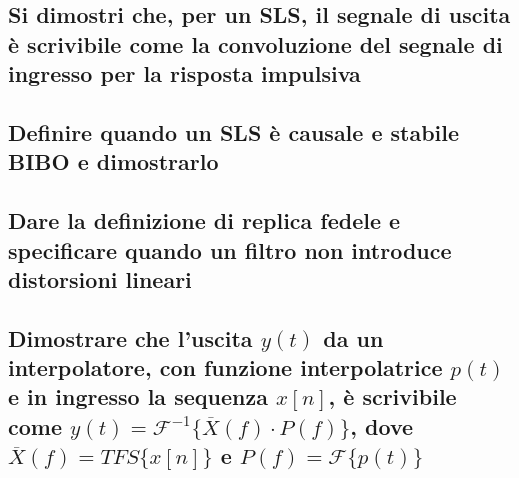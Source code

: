 \documentclass[12pt,oneside,openany]{memoir}
\numberwithin{equation}{subsection}
\begin{document}
\subsection{Si dimostri che, per un SLS, il segnale di uscita \`e scrivibile
come la convoluzione del segnale di ingresso per la risposta impulsiva}


\subsection{Definire quando un SLS \`e causale e stabile BIBO e dimostrarlo}


\subsection{Dare la definizione di replica fedele e specificare quando un filtro
non introduce distorsioni lineari}


\subsection{Dimostrare che l'uscita $y(t)$ da un interpolatore, con funzione
interpolatrice $p(t)$ e in ingresso la sequenza $x[n]$, \`e scrivibile come
$y(t) = \mathcal{F}^{-1}\{\overline{X}(f) \cdot P(f)\}$, dove $\overline{X}(f) =
TFS\{x[n]\}$ e $P(f) = \mathcal{F}\{p(t)\}$}

\end{document}

